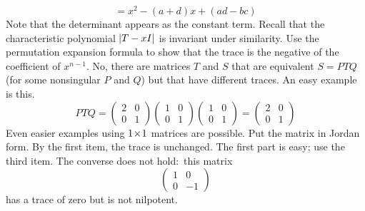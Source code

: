 \begin{exercises}
\begin{answer}
\begin{exparts}
\begin{equation*}
             =x^2-(a+d)x+(ad-bc)
           \end{equation*}
           Note that the determinant appears as the constant term.
         \partsitem Recall that the characteristic polynomial
            \( \deter{T-xI} \) is invariant under similarity.
            Use the permutation expansion formula to show that the trace
            is the negative of the coefficient of \( x^{n-1} \).
         \partsitem No, there are matrices $T$ and $S$ that are
            equivalent $S=PTQ$ (for some nonsingular $P$ and $Q$)
            but that have different traces.
            An easy example is this.
            \begin{equation*}
               PTQ=
               \begin{pmatrix}
                  2  &0  \\
                  0  &1
               \end{pmatrix}
               \begin{pmatrix}
                  1  &0  \\
                  0  &1
               \end{pmatrix}
               \begin{pmatrix}
                  1  &0  \\
                  0  &1
               \end{pmatrix}
               =
               \begin{pmatrix}
                  2  &0  \\
                  0  &1
               \end{pmatrix}
            \end{equation*}
            Even easier examples using $1 \! \times \! 1$ matrices are possible.
         \partsitem Put the matrix in Jordan form.
            By the first item, the trace is unchanged.
         \partsitem The first part is easy; use the third item.
            The converse does not hold:~this matrix
            \begin{equation*}
               \begin{pmatrix}
                  1  &0  \\
                  0  &-1
               \end{pmatrix}
            \end{equation*}
            has a trace of zero but is not nilpotent.
       \end{exparts}  
     \end{answer}
  \item 

\end{exercises}

